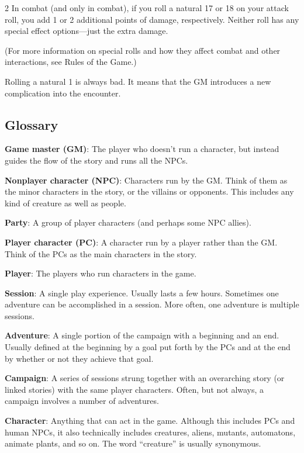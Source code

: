 \begin{multicols}{2}
In combat (and only in combat), if you roll a natural 17 or 18 on your attack roll, you add 1 or 2 additional points of damage, respectively. Neither roll has any special effect options—just the extra damage.

(For more information on special rolls and how they affect combat and other interactions, see Rules of the Game.)

Rolling a natural 1 is always bad. It means that the GM introduces a new complication into the encounter.

\subsection{Glossary}

\textbf{Game master (GM)}: The player who doesn’t run a character, but instead guides the flow of the story and runs all the NPCs.

\textbf{Nonplayer character (NPC)}: Characters run by the GM. Think of them as the minor characters in the story, or the villains or opponents. This includes any kind of creature as well as people.

\textbf{Party}: A group of player characters (and perhaps some NPC allies).

\textbf{Player character (PC)}: A character run by a player rather than the GM. Think of the PCs as the main characters in the story.

\textbf{Player}: The players who run characters in the game.

\textbf{Session}: A single play experience. Usually lasts a few hours. Sometimes one adventure can be accomplished in a session. More often, one adventure is multiple sessions.

\textbf{Adventure}: A single portion of the campaign with a beginning and an end. Usually defined at the beginning by a goal put forth by the PCs and at the end by whether or not they achieve that goal.

\textbf{Campaign}: A series of sessions strung together with an overarching story (or linked stories) with the same player characters. Often, but not always, a campaign involves a number of adventures.

\textbf{Character}: Anything that can act in the game. Although this includes PCs and human NPCs, it also technically includes creatures, aliens, mutants, automatons, animate plants, and so on. The word “creature” is usually synonymous.


\end{multicols}
